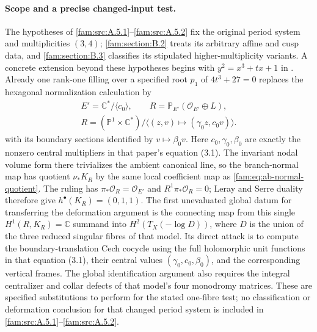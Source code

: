 \paragraph{Scope and a precise changed-input test.}
The hypotheses of \ref{fam:src:A.5.1}--\ref{fam:src:A.5.2} fix the original period system and
multiplicities $(3,4)$; \ref{fam:section:B.2} treats its arbitrary affine and cusp data,
and \ref{fam:section:B.3} classifies its stipulated higher-multiplicity variants.
A concrete extension beyond these hypotheses begins with
$y^2=x^3+tx+1$ in \cite[Sections 2--3 and Proposition 6.1]{ViaclovskyTwo2026}.
Already one rank-one filling over a specified root $p_1$ of
$4t^3+27=0$ replaces the hexagonal normalization calculation by
\[
 \begin{gathered}
 E'=\mathbb C^*/\langle c_0\rangle,\qquad
 R=\mathbb P_{E'}(\mathcal O_{E'}\oplus L),\\
 R=(\mathbb P^1\times\mathbb C^*)/
       \langle(z,v)\mapsto(\gamma_0z,c_0v)\rangle.
 \end{gathered}
\]
with its boundary sections identified by $v\mapsto\beta_0v$.
Here $c_0,\gamma_0,\beta_0$ are exactly the nonzero central multipliers
in that paper's equation (3.1). The invariant nodal volume form there
trivializes the ambient canonical line, so the branch-normal map has
quotient $\nu_*K_R$ by the same local coefficient map as
\eqref{fam:eq:ab-normal-quotient}. The ruling has
$\pi_*\mathcal O_R=\mathcal O_{E'}$ and $R^1\pi_*\mathcal O_R=0$;
Leray and Serre duality therefore give $h^\bullet(K_R)=(0,1,1)$.
The first unevaluated global datum for transferring the deformation
argument is the connecting map from this single
$H^1(R,K_R)=\mathbb C$ summand into $H^2(T_X(-\log D))$, where
$D$ is the union of the three reduced singular fibres of that model.
Its direct attack is to compute the boundary-translation Cech cocycle
using the full holomorphic unit functions in that equation (3.1),
their central values $(\gamma_0,c_0,\beta_0)$, and the corresponding
vertical frames.
The global identification argument also requires the integral
centralizer and collar defects of that model's four monodromy matrices.
These are specified substitutions to perform for the stated one-fibre
test; no classification or deformation conclusion for that changed
period system is included in \ref{fam:src:A.5.1}--\ref{fam:src:A.5.2}.

